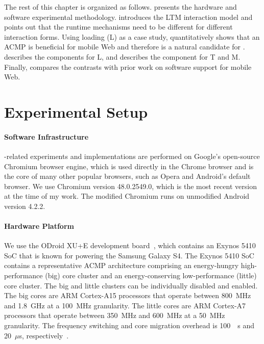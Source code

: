 The rest of this chapter is organized as follows.  presents the hardware and software experimental methodology.  introduces the LTM interaction model and points out that the runtime mechanisms need to be different for different interaction forms. Using loading (L) as a case study,  quantitatively shows that an ACMP is beneficial for mobile Web and therefore is a natural candidate for \webrt.  describes the \webrt components for L, and  describes the \webrt component for T and M. Finally,  compares the contrasts \webrt with prior work on software support for mobile Web.

\section{Experimental Setup}
\label{sec:runtime:exp}

\paragraph{Software Infrastructure} \webrt-related experiments and implementations are performed on Google's open-source Chromium browser engine, which is used directly in the Chrome browser and is the core of many other popular browsers, such as Opera and Android's default browser. We use Chromium version 48.0.2549.0, which is the most recent version at the time of my work. The modified Chromium runs on unmodified Android version 4.2.2.

\paragraph{Hardware Platform} We use the ODroid XU+E development board~\cite{odroidxue}, which contains an Exynos 5410 SoC that is known for powering the Samsung Galaxy S4. The Exynos 5410 SoC contains a representative ACMP architecture comprising an energy-hungry high-performance (big) core cluster and an energy-conserving low-performance (little) core cluster. The big and little clusters can be individually disabled and enabled. The big cores are ARM Cortex-A15 processors that operate between 800~MHz and 1.8~GHz at a 100~MHz granularity. The little cores are ARM Cortex-A7 processors that operate between 350~MHz and 600~MHz at a 50~MHz granularity. The frequency switching and core migration overhead is \SI{100}{\mu\second} and 20~$\mu$s, respectively~\cite{big-little,ebs}.

